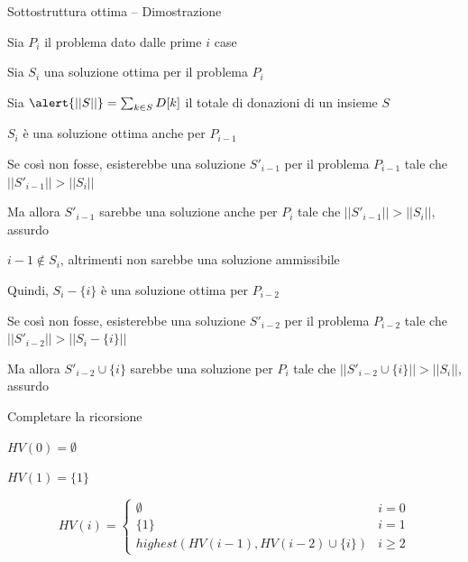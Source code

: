 \begin{frame}{Sottostruttura ottima -- Dimostrazione}

\BI
\item Sia \alert{$P_i$} il \alert{problema} dato dalle prime $i$ case
\item Sia \alert{$S_i$} una \alert{soluzione} ottima per il problema $P_i$
\item Sia $\alert{||S||} = \sum_{k \in S} D[k]$ il \alert{totale di donazioni} di un insieme $S$
\EI

\begin{overprint}
\BIL
\item $S_i$ è una soluzione ottima anche per $P_{i-1}$
\item Se così non fosse, esisterebbe una soluzione $S'_{i-1}$ per il
problema $P_{i-1}$ tale che $||S'_{i-1}||>||S_i||$
\item Ma allora $S'_{i-1}$ sarebbe una soluzione anche per $P_i$ tale
che $||S'_{i-1}||>||S_i||$, assurdo
\EIL
{}
\BIL
\item $i-1 \not\in S_i$, altrimenti non sarebbe una soluzione ammissibile
\item Quindi, $S_i-\{i\}$ è una soluzione ottima per $P_{i-2}$
\item Se così non fosse, esisterebbe una soluzione $S'_{i-2}$ per il
problema $P_{i-2}$ tale che $||S'_{i-2}||>||S_i-\{i\}||$
\item Ma allora $S'_{i-2} \cup \{i \}$ sarebbe una soluzione per $P_i$
tale che $||S'_{i-2} \cup \{i\}||>||S_i||$, assurdo
\EIL
\end{overprint}


\end{frame}



\begin{frame}{Completare la ricorsione}

\vspace{-9pt}
\pause
\BIL
\item $HV(0) = \emptyset$
\item $HV(1) = \{ 1 \}$
\EIL


\[
HV(i) = \begin{cases}
  \emptyset & i=0 \\
  \{ 1 \} & i=1 \\
  \mathit{highest}(HV(i-1), HV(i-2) \cup \{ i \}) & i \geq 2
  \end{cases}
\]

\end{frame}

